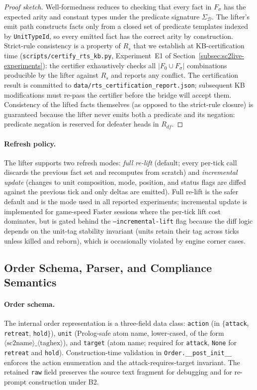 \documentclass{article}
\theoremstyle{definition}
\newcommand{\D}{\mathcal{D}}
\newcommand{\Rs}{R_s}
\newcommand{\Rdf}{R_{df}}
\begin{document}
\begin{proof}[Proof sketch]
Well-formedness reduces to checking that every fact in $F_\sigma$ has the expected arity and constant types under the predicate signature $\Sigma_\D$. The lifter's emit path constructs facts only from a closed set of predicate templates indexed by \texttt{UnitTypeId}, so every emitted fact has the correct arity by construction. Strict-rule consistency is a property of $\Rs$ that we establish at KB-certification time (\texttt{scripts/certify\_rts\_kb.py}, Experiment~E1 of Section~\ref{subsec:sc2live-experiments}): the certifier exhaustively checks all $|F_0 \cup F_\sigma|$ combinations producible by the lifter against $\Rs$ and reports any conflict. The certification result is committed to \texttt{data/rts\_certification\_report.json}; subsequent KB modifications must re-pass the certifier before the bridge will accept them. Consistency of the lifted facts themselves (as opposed to the strict-rule closure) is guaranteed because the lifter never emits both a predicate and its negation: predicate negation is reserved for defeater heads in $\Rdf$.
\end{proof}

\paragraph{Refresh policy.} The lifter supports two refresh modes: \emph{full re-lift} (default; every per-tick call discards the previous fact set and recomputes from scratch) and \emph{incremental update} (changes to unit composition, mode, position, and status flags are diffed against the previous tick and only deltas are emitted). Full re-lift is the safer default and is the mode used in all reported experiments; incremental update is implemented for game-speed Faster sessions where the per-tick lift cost dominates, but is gated behind the \texttt{--incremental-lift} flag because the diff logic depends on the unit-tag stability invariant (units retain their tag across ticks unless killed and reborn), which is occasionally violated by engine corner cases.


\subsection{Order Schema, Parser, and Compliance Semantics}\label{subsec:sc2live-orders}

\paragraph{Order schema.} The internal order representation is a three-field data class: \texttt{action} (in $\{$\texttt{attack}, \texttt{retreat}, \texttt{hold}$\}$), \texttt{unit} (Prolog-safe atom name, lower-cased, of the form $\langle\text{sc2name}\rangle\_\langle\text{taghex}\rangle$), and \texttt{target} (atom name; required for \texttt{attack}, \texttt{None} for \texttt{retreat} and \texttt{hold}). Construction-time validation in \texttt{Order.\_\_post\_init\_\_} enforces the action enumeration and the attack-requires-target invariant. The retained \texttt{raw} field preserves the source text fragment for debugging and for re-prompt construction under B2.
\end{document}
